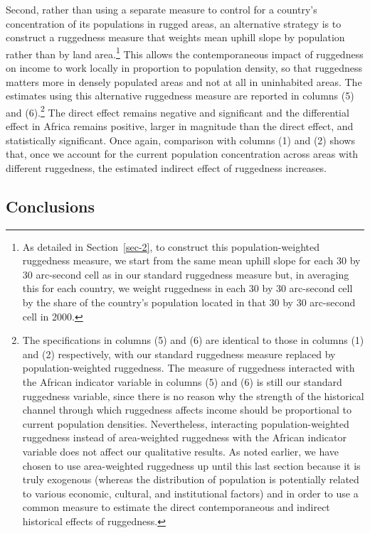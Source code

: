 \documentclass[
  letterpaper,
  DIV=11,
  numbers=noendperiod]{scrartcl}
\begin{document}
Second, rather than using a separate measure to control for a country's
concentration of its populations in rugged areas, an alternative
strategy is to construct a ruggedness measure that weights mean uphill
slope by population rather than by land area.\footnote{As detailed in
  Section~\ref{sec-2}, to construct this population-weighted ruggedness
  measure, we start from the same mean uphill slope for each 30 by 30
  arc-second cell as in our standard ruggedness measure but, in
  averaging this for each country, we weight ruggedness in each 30 by 30
  arc-second cell by the share of the country's population located in
  that 30 by 30 arc-second cell in 2000.} This allows the
contemporaneous impact of ruggedness on income to work locally in
proportion to population density, so that ruggedness matters more in
densely populated areas and not at all in uninhabited areas. The
estimates using this alternative ruggedness measure are reported in
columns (5) and (6).\footnote{The specifications in columns (5) and (6)
  are identical to those in columns (1) and (2) respectively, with our
  standard ruggedness measure replaced by population-weighted
  ruggedness. The measure of ruggedness interacted with the African
  indicator variable in columns (5) and (6) is still our standard
  ruggedness variable, since there is no reason why the strength of the
  historical channel through which ruggedness affects income should be
  proportional to current population densities. Nevertheless,
  interacting population-weighted ruggedness instead of area-weighted
  ruggedness with the African indicator variable does not affect our
  qualitative results. As noted earlier, we have chosen to use
  area-weighted ruggedness up until this last section because it is
  truly exogenous (whereas the distribution of population is potentially
  related to various economic, cultural, and institutional factors) and
  in order to use a common measure to estimate the direct
  contemporaneous and indirect historical effects of ruggedness.} The
direct effect remains negative and significant and the differential
effect in Africa remains positive, larger in magnitude than the direct
effect, and statistically significant. Once again, comparison with
columns (1) and (2) shows that, once we account for the current
population concentration across areas with different ruggedness, the
estimated indirect effect of ruggedness increases.

\subsection{Conclusions}\label{conclusions}
\end{document}
